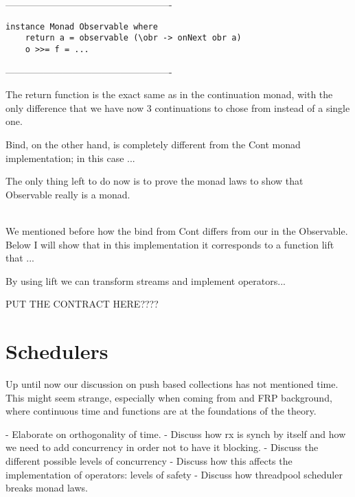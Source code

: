 ----------------------------------------------------
\begin{verbatim}
instance Monad Observable where
	return a = observable (\obr -> onNext obr a)
	o >>= f = ...
\end{verbatim}
----------------------------------------------------  

The return function is the exact same as in the continuation monad, with the only difference that we have now 3 continuations to chose from instead of a single one. 

Bind, on the other hand, is completely different from the Cont monad implementation; in this case ... 

The only thing left to do now is to prove the monad laws to show that Observable really is a monad.

\\

We mentioned before how the bind from Cont differs from our in the Observable. Below I will show that in this implementation it corresponds to a function lift that ... 

By using lift we can transform streams and implement operators...


PUT THE CONTRACT HERE????

\section{Schedulers}

Up until now our discussion on push based collections has not mentioned time. This might seem strange, especially when coming from and FRP background, where continuous time and functions are at the foundations of the theory. 

- Elaborate on orthogonality of time.
- Discuss how rx is synch by itself and how we need to add concurrency in order not to have it blocking. 
- Discuss the different possible levels of concurrency
- Discuss how this affects the implementation of operators: levels of safety
- Discuss how threadpool scheduler breaks monad laws. 

